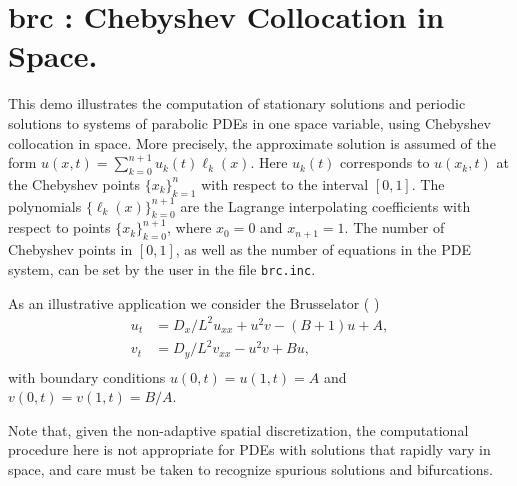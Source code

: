 \documentclass[12pt]{report}
\begin{document}
\newpage
\section{ brc : Chebyshev Collocation in Space.} \label{sec:Demos_brc}
This demo illustrates the computation of stationary solutions and periodic
solutions to systems of parabolic PDEs in one space variable,
using Chebyshev collocation in space.
More precisely, the approximate solution is assumed of the form
$u(x,t) = \sum_{k=0}^{n+1} u_k(t) \ell_k(x)$.
Here $u_k(t)$ corresponds to $u(x_k,t)$ at the Chebyshev points
$\bigl\{ x_k \bigr\}_{k=1}^{n}$ with respect to the interval $[0,1]$.
The polynomials $\bigl\{ \ell_k(x) \bigr\}_{k=0}^{n+1}$ are the Lagrange
interpolating coefficients with respect to points 
$\bigl\{ x_k \bigr\}_{k=0}^{n+1}$, where $x_0=0$ and $x_{n+1}=1$.
The number of Chebyshev points in $[0,1]$,
as well as the number of equations in the PDE system,
can be set by the user in the file {\tt brc.inc}.

As an illustrative application we consider the Brusselator
( \citeyear{HoKnKu:87})
\begin{equation} \begin{array}{cl}
  u_t &= {D_x / L^2} u_{xx} + u^2v - (B+1)u + A,  \\
  v_t &= {D_y / L^2} v_{xx} - u^2v + Bu,  \\
\end{array} \end{equation}
with boundary conditions $u(0,t)=u(1,t)=A$
and $v(0,t)=v(1,t)=B/A$.

Note that, given the non-adaptive spatial discretization,
the computational procedure here is not appropriate for
PDEs with solutions that rapidly vary in space, and care must
be taken to recognize spurious solutions and bifurcations.
\end{document}
